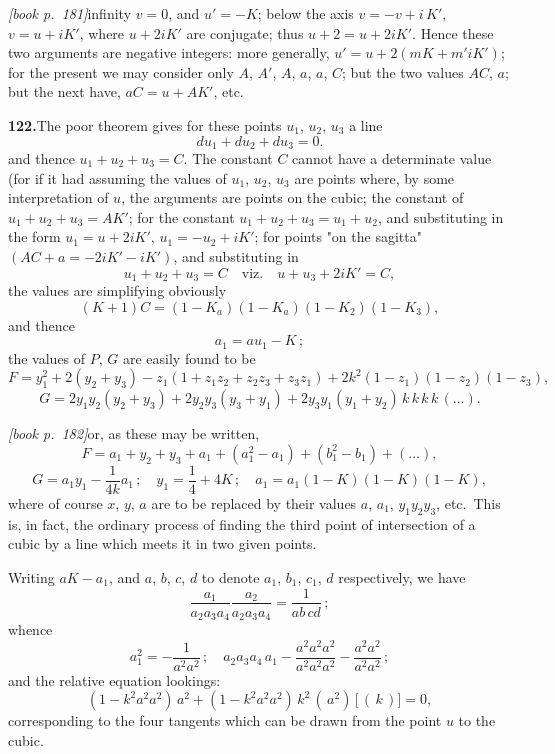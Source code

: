\documentclass[11pt,a4paper]{article}
\begin{document}
\medskip\noindent\textit{[book p.~181]}\quad infinity $v = 0$, and $u' = -K$; below the axis $v = -v + i\,K'$, $v = u + iK'$, where $u + 2iK'$ are conjugate; thus $u + 2 = u + 2iK'$. Hence these two arguments are negative integers: more generally, $u' = u + 2(mK + m'iK')$; for the present we may consider only $A$, $A'$, $A$, $a$, $a$, $C$; but the two values $AC$, $a$; but the next have, $aC = u + AK'$, etc.

\medskip\noindent\textbf{122.}\quad The poor theorem gives for these points $u_1$, $u_2$, $u_3$ a line
\[
du_1 + du_2 + du_3 = 0.
\]
and thence $u_1 + u_2 + u_3 = C$. The constant $C$ cannot have a determinate value (for if it had assuming the values of $u_1$, $u_2$, $u_3$ are points where, by some interpretation of $u$, the arguments are points on the cubic; the constant of $u_1 + u_2 + u_3 = AK'$; for the constant $u_1 + u_2 + u_3 = u_1 + u_2$, and substituting in the form $u_1 = u + 2iK'$, $u_1 = -u_2 + iK'$; for points "on the sagitta" $(AC + a = -2iK' - iK')$, and substituting in
\[
u_1 + u_2 + u_3 = C\quad\text{viz.}\quad u + u_3 + 2iK' = C,
\]
the values are simplifying obviously
\[
(K + 1)C = (1 - K_a)(1 - K_a)(1 - K_2)(1 - K_3),
\]
and thence
\[
a_1 = a u_1 - K\,;
\]
the values of $P$, $G$ are easily found to be
\[
F = y_1^2 + 2(y_2 + y_3) - z_1(1 + z_1 z_2 + z_2 z_3 + z_3 z_1) + 2k^2 (1 - z_1)(1 - z_2)(1 - z_3),
\]
\[
G = 2y_1 y_2 (y_2 + y_3) + 2y_2 y_3(y_3 + y_1) + 2y_3 y_1(y_1 + y_2)\,k\,k\,k\,k\,(\ldots).
\]

\medskip\noindent\textit{[book p.~182]}\quad or, as these may be written,
\[
F = a_1 + y_2 + y_3 + a_1 + (a_1^2 - a_1) + (b_1^2 - b_1) + (\ldots),
\]
\[
G = a_1 y_1 - \frac{1}{4k}a_1\,;\quad y_1 = \frac{1}{4} + 4K\,;\quad a_1 = a_1 (1 - K)(1 - K)(1 - K),
\]
where of course $x$, $y$, $a$ are to be replaced by their values $a$, $a_1$, $y_1 y_2 y_3$, etc.\ This is, in fact, the ordinary process of finding the third point of intersection of a cubic by a line which meets it in two given points.

Writing $aK - a_1$, and $a$, $b$, $c$, $d$ to denote $a_1$, $b_1$, $c_1$, $d$ respectively, we have
\[
\frac{a_1}{a_2 a_3 a_4} \frac{a_2}{a_2 a_3 a_4} = \frac{1}{ab\,cd}\,;
\]
whence
\[
a_1^2 = -\frac{1}{a^2 a^2}\,;\quad a_2 a_3 a_4 \, a_1 - \frac{a^2 a^2 a^2}{a^2 a^2 a^2} - \frac{a^2 a^2}{a^2 a^2}\,;
\]
and the relative equation lookings:
\[
(1 - k^2 a^2 a^2)\,a^2 + (1 - k^2 a^2 a^2)\,k^2\,(\,a^2)\,\bigl[\,(\,k\,)\bigl] = 0,
\]
corresponding to the four tangents which can be drawn from the point $u$ to the cubic.
\end{document}
